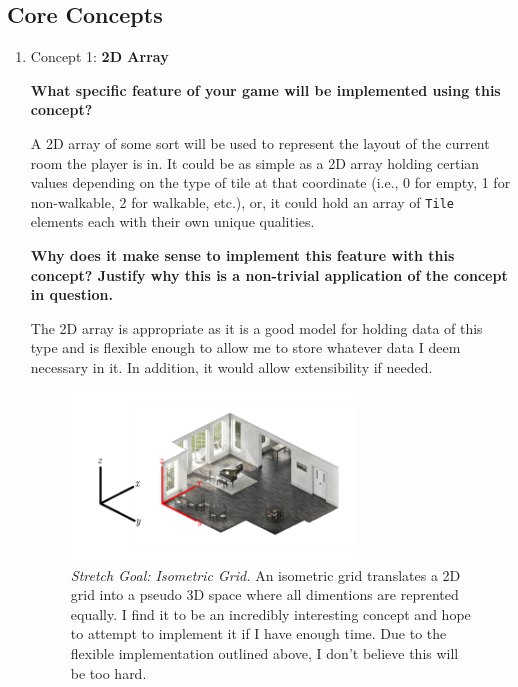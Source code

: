 \documentclass[12pt]{article}
\begin{document}
  \subsection*{Core Concepts}

  \begin{enumerate}[leftmargin=\labelsep]
    \item Concept 1: \textbf{2D Array}
    
    \textbf{What specific feature of your game will be implemented using this
      concept?
   }
   
    A 2D array of some sort will be used to represent the layout of the current 
    room the player is in. It could be as simple as a 2D array holding certian 
    values depending on the type of tile at that coordinate (i.e., 0 for empty, 
    1 for non-walkable, 2 for walkable, etc.), or, it could hold an array of 
    \texttt{Tile} elements each with their own unique qualities.
    
    \textbf{Why does it make sense to implement this feature with this concept?
      Justify why this is a non-trivial application of the concept in question.
    }
    
    The 2D array is appropriate as it is a good model for holding data of this 
    type and is flexible enough to allow me to store whatever data I deem 
    necessary in it. In addition, it would allow extensibility if needed.
    
    \begin{figure}
      \centering
      \includegraphics[width=3in]{iso}
      \captionsetup{labelformat=empty}
      \caption{
        \textit{Stretch Goal: Isometric Grid.}
        An isometric grid translates a 2D grid into a pseudo 3D space where all 
        dimentions are reprented equally. I find it to be an incredibly 
        interesting concept and hope to attempt to implement it if I have enough
        time. Due to the flexible implementation outlined above, I don't believe
        this will be too hard.
      }
    \end{figure}
    

\end{enumerate}
\end{document}

